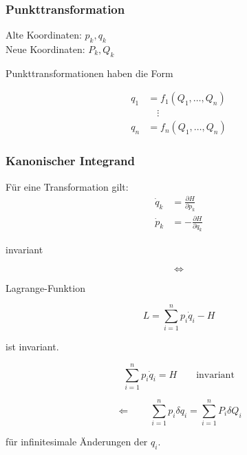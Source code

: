 \begin{frame}
    \frametitle{Punkttransformation}
    
    Alte Koordinaten: $p_k, q_k$ \\
    Neue Koordinaten: $P_k, Q_k$
    
    Punkttransformationen haben die Form
    
    \begin{align*}
    q_1 &= f_1(Q_1,\ldots,Q_n) \\
        &\quad\vdots \\
    q_n &= f_n(Q_1,\ldots,Q_n)    
    \end{align*}
    
\end{frame}

\begin{frame}
    \frametitle{Kanonischer Integrand}
    
    Für eine Transformation gilt:
        \begin{align*}
        \dot{q}_k &= \frac{\partial H}{\partial p_k} \\
        \dot{p}_k &= -\frac{\partial H}{\partial q_k}		
        \end{align*}
      \begin{center}  invariant \end{center} 
        
        \begin{displaymath}
        \Longleftrightarrow
        \end{displaymath}
        
      \begin{center} Lagrange-Funktion \end{center} 
        \begin{displaymath}
        L = \sum_{i=1}^n p_i \dot{q}_i - H
        \end{displaymath}
      \begin{center}  ist invariant. \end{center} 

\end{frame}

\begin{frame}
    \begin{displaymath}
    \sum_{i=1}^n p_i \dot{q}_i = H \qquad \text{invariant}
    \end{displaymath}
    
    \begin{displaymath}
    \Longleftarrow \qquad \sum_{i=1}^n p_i \delta q_i = \sum_{i=1}^n P_i \delta Q_i
    \end{displaymath}
    
    für infinitesimale Änderungen der $q_i$.
    
\end{frame}

